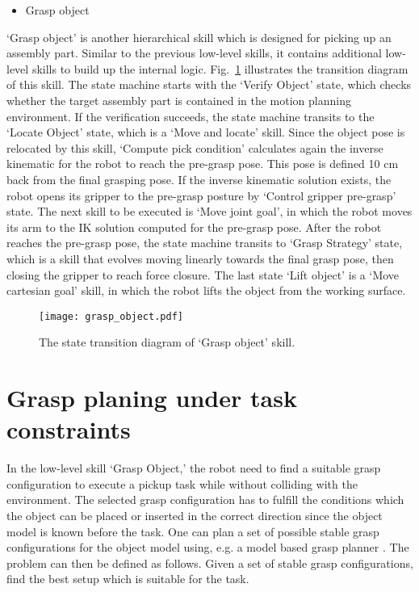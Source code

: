 \begin{itemize}
\item Grasp object
\end{itemize}
`Grasp object' is another hierarchical skill which is designed for picking up an assembly part. Similar to the previous low-level skills, it contains additional low-level skills to build up the internal logic. Fig.~\ref{fig:grasp_object} illustrates the transition diagram of this skill. The state machine starts with the `Verify Object' state, which checks whether the target assembly part is contained in the motion planning environment. If the verification succeeds, the state machine transits to the `Locate Object' state, which is a `Move and locate' skill. Since the object pose is relocated by this skill, `Compute pick condition' calculates again the inverse kinematic for the robot to reach the pre-grasp pose. This pose is defined 10 cm back from the final grasping pose. If the inverse kinematic solution exists, the robot opens its gripper to the pre-grasp posture by `Control gripper pre-grasp' state. The next skill to be executed is `Move joint goal', in which the robot moves its arm to the IK solution computed for the pre-grasp pose. After the robot reaches the pre-grasp pose, the state machine transits to `Grasp Strategy' state, which is a skill that evolves moving linearly towards the final grasp pose, then closing the gripper to reach force closure. The last state `Lift object' is a `Move cartesian goal' skill, in which the robot lifts the object from the working surface.  
\begin{figure}[!htbp]
\centering
\texttt{[image: grasp\_object.pdf]}
\captionsetup{justification=raggedright}
\caption{The state transition diagram of `Grasp object' skill.}
\label{fig:grasp_object}
\end{figure}



\section{Grasp planing under task constraints}
In the low-level skill `Grasp Object,' the robot need to find a suitable grasp configuration to execute a pickup task while without colliding with the environment. The selected grasp configuration has to fulfill the conditions which the object can be placed or inserted in the correct direction since the object model is known before the task. One can plan a set of possible stable grasp configurations for the object model using, e.g. a model based grasp planner \cite{Xue2009}. The problem can then be defined as follows. Given a set of stable grasp configurations, find the best setup which is suitable for the task.

